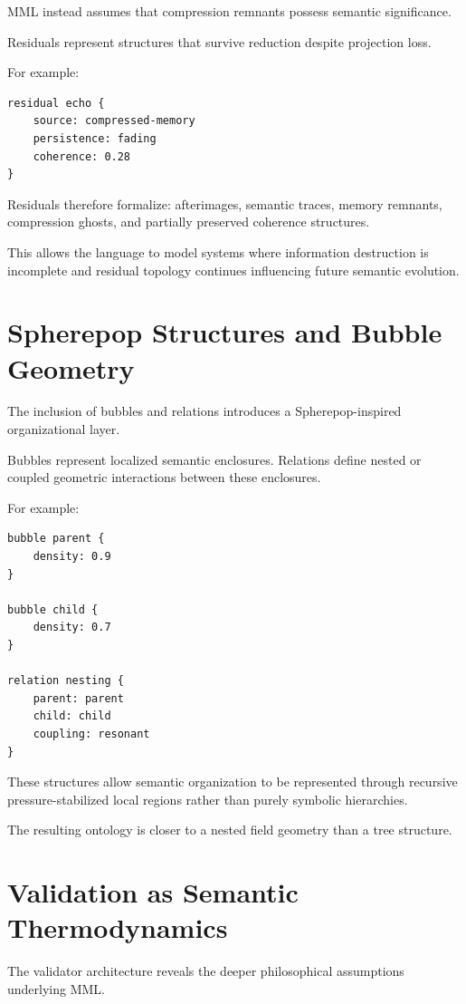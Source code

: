 \documentclass[11pt]{article}
\begin{document}
MML instead assumes that compression remnants possess semantic significance.

Residuals represent structures that survive reduction despite projection loss.

For example:

\begin{lstlisting}
residual echo {
    source: compressed-memory
    persistence: fading
    coherence: 0.28
}
\end{lstlisting}

Residuals therefore formalize:
afterimages,
semantic traces,
memory remnants,
compression ghosts,
and partially preserved coherence structures.

This allows the language to model systems where information destruction is incomplete and residual topology continues influencing future semantic evolution.

\section{Spherepop Structures and Bubble Geometry}

The inclusion of bubbles and relations introduces a Spherepop-inspired organizational layer.

Bubbles represent localized semantic enclosures. Relations define nested or coupled geometric interactions between these enclosures.

For example:

\begin{lstlisting}
bubble parent {
    density: 0.9
}

bubble child {
    density: 0.7
}

relation nesting {
    parent: parent
    child: child
    coupling: resonant
}
\end{lstlisting}

These structures allow semantic organization to be represented through recursive pressure-stabilized local regions rather than purely symbolic hierarchies.

The resulting ontology is closer to a nested field geometry than a tree structure.

\section{Validation as Semantic Thermodynamics}

The validator architecture reveals the deeper philosophical assumptions underlying MML.
\end{document}
